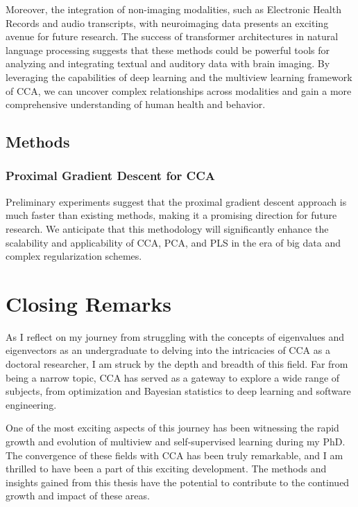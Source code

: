 Moreover, the integration of non-imaging modalities, such as Electronic Health Records and audio transcripts, with neuroimaging data presents an exciting avenue for future research. The success of transformer architectures in natural language processing suggests that these methods could be powerful tools for analyzing and integrating textual and auditory data with brain imaging. By leveraging the capabilities of deep learning and the multiview learning framework of CCA, we can uncover complex relationships across modalities and gain a more comprehensive understanding of human health and behavior.

\subsection{Methods}

\subsubsection{Proximal Gradient Descent for CCA}

Preliminary experiments suggest that the proximal gradient descent approach is much faster than existing methods, making it a promising direction for future research. We anticipate that this methodology will significantly enhance the scalability and applicability of CCA, PCA, and PLS in the era of big data and complex regularization schemes.

\section{Closing Remarks}

As I reflect on my journey from struggling with the concepts of eigenvalues and eigenvectors as an undergraduate to delving into the intricacies of CCA as a doctoral researcher, I am struck by the depth and breadth of this field. Far from being a narrow topic, CCA has served as a gateway to explore a wide range of subjects, from optimization and Bayesian statistics to deep learning and software engineering.

One of the most exciting aspects of this journey has been witnessing the rapid growth and evolution of multiview and self-supervised learning during my PhD. The convergence of these fields with CCA has been truly remarkable, and I am thrilled to have been a part of this exciting development. The methods and insights gained from this thesis have the potential to contribute to the continued growth and impact of these areas.

